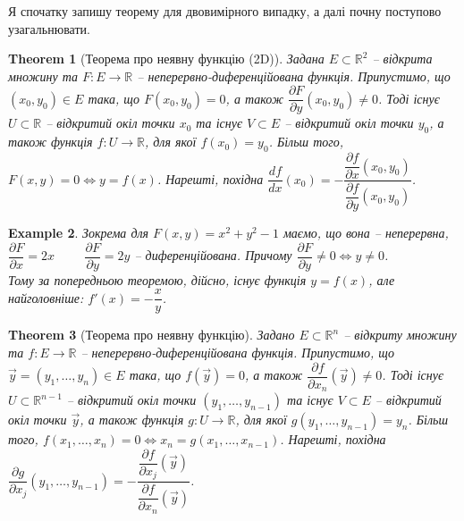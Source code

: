 \documentclass[a4paper, 10pt]{article}
\def\departial#1#2{\dfrac{\partial {#1}}{\partial {#2}}}
\theoremstyle{theoremdd}
\newtheorem{theorem}{Theorem}[subsection]
\theoremstyle{theoremdd}
\theoremstyle{theoremdd}
\theoremstyle{theoremdd}
\theoremstyle{theoremdd}
\newtheorem{example}[theorem]{Example}
\theoremstyle{theoremdd}
\theoremstyle{theoremdd}
\theoremstyle{theoremdd}
\theoremstyle{theoremdd}
\begin{document}
Я спочатку запишу теорему для двовимірного випадку, а далі почну поступово узагальнювати.

\begin{theorem}[Теорема про неявну функцію (2D)]
Задана $E \subset \mathbb{R}^2$ -- відкрита множину та $F \colon E \to \mathbb{R}$ -- неперервно-диференційована функція. Припустимо, що $(x_0,y_0) \in E$ така, що $F(x_0,y_0) = 0$, а також $\departial{F}{y}(x_0,y_0) \neq 0$. Тоді існує $U \subset \mathbb{R}$ -- відкритий окіл точки $x_0$ та існує $V \subset E$ -- відкритий окіл точки $y_0$, а також функція $f \colon U \to \mathbb{R}$, для якої $f(x_0) = y_0$. Більш того, $F(x,y) = 0 \iff y = f(x)$. Нарешті, похідна $\dfrac{df}{dx}(x_0) = -\dfrac{\departial{f}{x}(x_0,y_0)}{\departial{f}{y}(x_0,y_0)}$.
\end{theorem}

\begin{example}
Зокрема для $F(x,y) = x^2+y^2-1$ маємо, що вона -- неперервна,\\
$\departial{F}{x} = 2x \hspace{1cm} \departial{F}{y} = 2y$ -- диференційована. Причому $\departial{F}{y} \neq 0 \iff y \neq 0$.\\
Тому за попередньою теоремою, дійсно, існує функція $y = f(x)$, але найголовніше: $f'(x) = -\dfrac{x}{y}$.
\end{example}

\begin{theorem}[Теорема про неявну функцію]
Задано $E \subset \mathbb{R}^n$ -- відкриту множину та $f \colon E \to \mathbb{R}$ -- неперервно-диференційована функція. Припустимо, що $\vec{y} = (y_1,\dots,y_n) \in E$ така, що $f(\vec{y}) = 0$, а також $\departial{f}{x_n}(\vec{y}) \neq 0$. Тоді існує $U \subset \mathbb{R}^{n-1}$ -- відкритий окіл точки $(y_1,\dots,y_{n-1})$ та існує $V \subset E$ -- відкритий окіл точки $\vec{y}$, а також функція $g \colon U \to \mathbb{R}$, для якої $g(y_1,\dots,y_{n-1}) = y_n$. Більш того, $f(x_1,\dots,x_n) = 0 \iff x_n = g(x_1,\dots,x_{n-1})$. Нарешті, похідна $\departial{g}{x_j}(y_1,\dots,y_{n-1}) = -\dfrac{\departial{f}{x_j}(\vec{y})}{\departial{f}{x_n}(\vec{y})}$.
\end{theorem}
\end{document}

